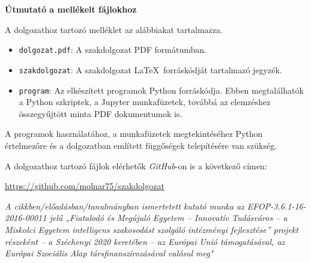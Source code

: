\pagestyle{empty}

\noindent \textbf{\Large Útmutató a mellékelt fájlokhoz}

\vskip 1cm

\noindent A dolgozathoz tartozó melléklet az alábbiakat tartalmazza.
\begin{itemize}
\item \texttt{dolgozat.pdf}: A szakdolgozat PDF formátumban.
\item \texttt{szakdolgozat}: A szakdolgozat \LaTeX\ forráskódját tartalmazó jegyzék.
\item \texttt{program}: Az elkészített programok Python forráskódja. Ebben megtalálhatók a Python szkriptek, a Jupyter munkafüzetek, továbbá az elemzéshez összegyűjtött minta PDF dokumentumok is.
\end{itemize}

\bigskip

\noindent A programok használatához, a munkafüzetek megtekintéséhez Python értelmezőre és a dolgozatban említett függőségek telepítésére van szükség.

\bigskip

\noindent A dolgozathoz tartozó fájlok elérhetők \textit{GitHub}-on is a következő címen:

\medskip

\quad \url{https://github.com/molnar75/szakdolgozat}

\pagebreak

\emph{A cikkben/előadásban/tanulmányban ismertetett kutató munka az
EFOP-3.6.1-16-2016-00011 jelű „Fiatalodó és Megújuló Egyetem –
Innovatív Tudásváros – a Miskolci Egyetem intelligens szakosodást
szolgáló intézményi fejlesztése” projekt részeként – a
Széchenyi 2020 keretében – az Európai Unió támogatásával, az
Európai Szociális Alap társfinanszírozásával valósul meg"}
